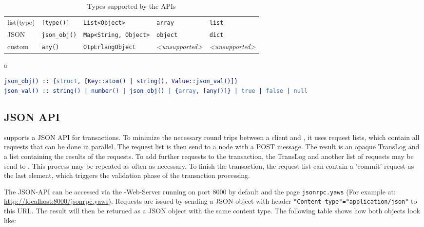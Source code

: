 \documentclass[a4paper]{scrreprt}
\newcommand{\code}[1]{\lstinline[basicstyle=\ttfamily]!#1!}
\begin{document}
\begin{table}
\begin{threeparttable}[b]
\begin{tabular}{lllll}
    list(type) & \code{[type()]}   & \code{List<Object>}          & \code{array}                    & \code{list}               \\
    JSON       & \code{json_obj()}\tnote{a}%
                                   & \code{Map<String, Object>}   & \code{object}                   & \code{dict}               \\
    custom     & \code{any()}      & \code{OtpErlangObject}       & \emph{<unsupported>}            & \emph{<unsupported>}      \\
    \bottomrule
    \end{tabular}
    \begin{tablenotes}
      \item[a] ~\vspace{-1.5em}%
\begin{lstlisting}[language=erlang]
json_obj() :: {struct, [Key::atom() | string(), Value::json_val()]}
json_val() :: string() | number() | json_obj() | {array, [any()]} | true | false | null
\end{lstlisting}
    \end{tablenotes}
    \caption{Types supported by the \scalaris{} APIs}
    \label{api.supported_types}
  \end{threeparttable}
\end{table}

\subsection{JSON API}
\label{sec.api.json}

\scalaris{} supports a JSON API for transactions. To minimize the necessary
round trips between a client and \scalaris{}, it uses request lists, which
contain all requests that can be done in parallel. The request list is then
send to a \scalaris{} node with a POST message. The result is an opaque
TransLog and a list containing the results of the requests. To add further
requests to the transaction, the TransLog and another list of requests may
be send to \scalaris{}. This process may be repeated as often as necessary.
To finish the transaction, the request list can contain a 'commit' request
as the last element, which triggers the validation phase of the transaction
processing.

The JSON-API can be accessed via the \scalaris{}-Web-Server running on port
8000 by default and the page \code{jsonrpc.yaws} (For example at:
\url{http://localhost:8000/jsonrpc.yaws}).
Requests are issued by sending a JSON object with header
\code{"Content-type"="application/json"} to this URL.
The result will then be returned as a JSON object with the same content type.
The following table shows how both objects look like:
\end{document}
